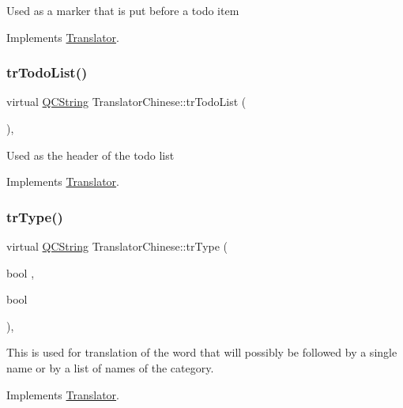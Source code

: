 Used as a marker that is put before a todo item 

Implements \mbox{\hyperlink{class_translator}{Translator}}.

\mbox{\label{class_translator_chinese_ae8d694cf334f108ed16a5f2740bdcf1e}} 
\subsubsection{\texorpdfstring{trTodoList()}{trTodoList()}}
{\footnotesize\ttfamily virtual \mbox{\hyperlink{class_q_c_string}{Q\+C\+String}} Translator\+Chinese\+::tr\+Todo\+List (\begin{DoxyParamCaption}{ }\end{DoxyParamCaption})\hspace{0.3cm}{\ttfamily [inline]}, {\ttfamily [virtual]}}

Used as the header of the todo list 

Implements \mbox{\hyperlink{class_translator}{Translator}}.

\mbox{\label{class_translator_chinese_ab9ac4259fdcf8844575dbd2b14d3dfd7}} 
\subsubsection{\texorpdfstring{trType()}{trType()}}
{\footnotesize\ttfamily virtual \mbox{\hyperlink{class_q_c_string}{Q\+C\+String}} Translator\+Chinese\+::tr\+Type (\begin{DoxyParamCaption}\item[{bool}]{,  }\item[{bool}]{ }\end{DoxyParamCaption})\hspace{0.3cm}{\ttfamily [inline]}, {\ttfamily [virtual]}}

This is used for translation of the word that will possibly be followed by a single name or by a list of names of the category. 

Implements \mbox{\hyperlink{class_translator}{Translator}}.

\mbox{\label{class_translator_chinese_a3fae3e9b8d961fff3b85130f84ef4445}} 
